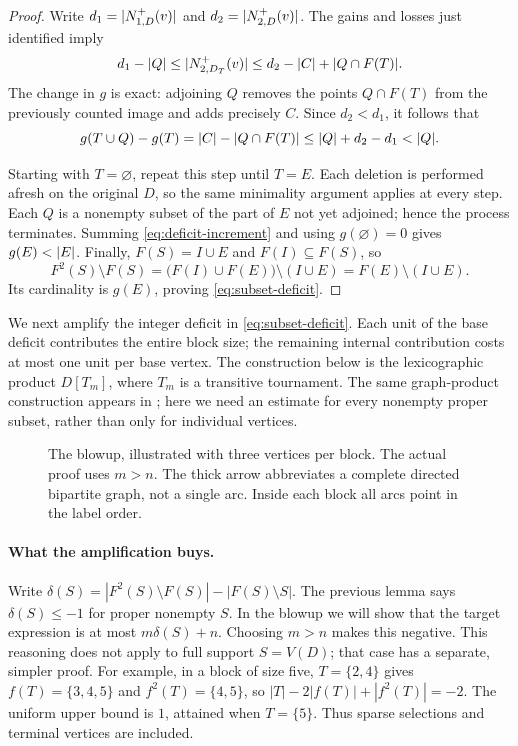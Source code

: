 \begin{proof}
Write $d_1=\lvert N_{1,D}^+(v)\rvert$ and
$d_2=\lvert N_{2,D}^+(v)\rvert$.  The gains and losses just identified imply
\[
  d_1-\lvert Q\rvert
  \le \lvert N_{2,D_T}^+(v)\rvert
  \le d_2-\lvert C\rvert+\lvert Q\cap F(T)\rvert.
\]
The change in $g$ is exact: adjoining $Q$ removes the points
$Q\cap F(T)$ from the previously counted image and adds precisely $C$.
Since $d_2<d_1$, it follows that
\begin{equation}
\label{eq:deficit-increment}
  g(T\cup Q)-g(T)
  =\lvert C\rvert-\lvert Q\cap F(T)\rvert
  \le \lvert Q\rvert+d_2-d_1
  <\lvert Q\rvert.
\end{equation}

Starting with $T=\varnothing$, repeat this step until $T=E$.
Each deletion is performed afresh on the original $D$, so the same
minimality argument applies at every step.  Each $Q$ is a nonempty
subset of the part of $E$ not yet adjoined; hence the process terminates.
Summing \eqref{eq:deficit-increment} and using $g(\varnothing)=0$
gives $g(E)<\lvert E\rvert$.  Finally,
$F(S)=I\cup E$ and $F(I)\subseteq F(S)$, so
\[
  F^2(S)\setminus F(S)
  =\bigl(F(I)\cup F(E)\bigr)\setminus(I\cup E)
  =F(E)\setminus(I\cup E).
\]
Its cardinality is $g(E)$, proving \eqref{eq:subset-deficit}.
\end{proof}

We next amplify the integer deficit in \eqref{eq:subset-deficit}.
Each unit of the base deficit contributes the entire block size; the
remaining internal contribution costs at most one unit per base vertex.
The construction below is the lexicographic product $D[T_m]$, where $T_m$
is a transitive tournament.  The same graph-product construction appears
in \cite[Theorem~4.3]{BrantnerBrockmanKaySnively2009}; here we need an
estimate for every nonempty proper subset, rather than only for individual
vertices.


\begin{figure}[ht]\centering
\caption{The blowup, illustrated with three vertices per block. The actual proof uses $m>n$. The thick arrow abbreviates a complete directed bipartite graph, not a single arc. Inside each block all arcs point in the label order.}
\end{figure}
\paragraph{What the amplification buys.}
Write $\delta(S)=|F^2(S)\setminus F(S)|-|F(S)\setminus S|$.
The previous lemma says $\delta(S)\le-1$ for proper nonempty $S$.
In the blowup we will show that the target expression is at most
$m\delta(S)+n$. Choosing $m>n$ makes this negative. This reasoning does not
apply to full support $S=V(D)$; that case has a separate, simpler proof.
For example, in a block of size five, $T=\{2,4\}$ gives
$f(T)=\{3,4,5\}$ and $f^2(T)=\{4,5\}$, so
$|T|-2|f(T)|+|f^2(T)|=-2$. The uniform upper bound is $1$, attained when
$T=\{5\}$. Thus sparse selections and terminal vertices are included.

